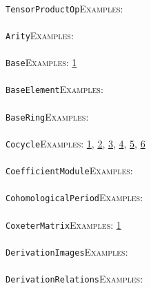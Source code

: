 \documentclass[a4paper,11pt]{report}
\begin{document}
{{ \\
 \texttt{TensorProductOp}{\nobreakspace}{\nobreakspace}{\nobreakspace}{\nobreakspace}\textsc{Examples:} \\
 \\
 \texttt{Arity}{\nobreakspace}{\nobreakspace}{\nobreakspace}{\nobreakspace}\textsc{Examples:} \\
 \\
 \texttt{Base}{\nobreakspace}{\nobreakspace}{\nobreakspace}{\nobreakspace}\textsc{Examples:} \href{../www/SideLinks/About/aboutKnots.html} {1}{\nobreakspace} \\
 \\
 \texttt{BaseElement}{\nobreakspace}{\nobreakspace}{\nobreakspace}{\nobreakspace}\textsc{Examples:} \\
 \\
 \texttt{BaseRing}{\nobreakspace}{\nobreakspace}{\nobreakspace}{\nobreakspace}\textsc{Examples:} \\
 \\
 \texttt{Cocycle}{\nobreakspace}{\nobreakspace}{\nobreakspace}{\nobreakspace}\textsc{Examples:} \href{../www/SideLinks/About/aboutCocycles.html} {1}{\nobreakspace}, \href{../www/SideLinks/About/aboutPolytopes.html} {2}{\nobreakspace}, \href{../www/SideLinks/About/aboutCrossedMods} {3}{\nobreakspace}, \href{../www/SideLinks/About/aboutCrossedMods.html} {4}{\nobreakspace}, \href{../www/SideLinks/About/aboutRosenbergerMonster.html} {5}{\nobreakspace}, \href{../www/SideLinks/About/aboutGouter.html} {6}{\nobreakspace} \\
 \\
 \texttt{CoefficientModule}{\nobreakspace}{\nobreakspace}{\nobreakspace}{\nobreakspace}\textsc{Examples:} \\
 \\
 \texttt{CohomologicalPeriod}{\nobreakspace}{\nobreakspace}{\nobreakspace}{\nobreakspace}\textsc{Examples:} \\
 \\
 \texttt{CoxeterMatrix}{\nobreakspace}{\nobreakspace}{\nobreakspace}{\nobreakspace}\textsc{Examples:} \href{../www/SideLinks/About/aboutDavisComplex.html} {1}{\nobreakspace} \\
 \\
 \texttt{DerivationImages}{\nobreakspace}{\nobreakspace}{\nobreakspace}{\nobreakspace}\textsc{Examples:} \\
 \\
 \texttt{DerivationRelations}{\nobreakspace}{\nobreakspace}{\nobreakspace}{\nobreakspace}\textsc{Examples:} \\
}}
\end{document}
